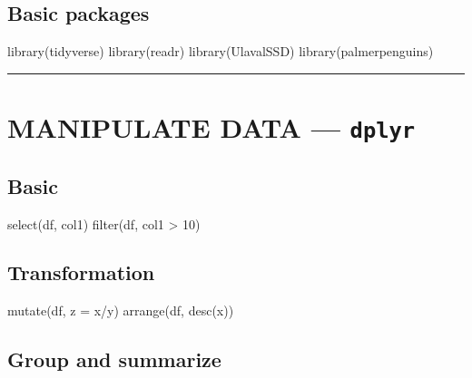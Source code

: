 \documentclass[
  8pt,
  letterpaper,
  DIV=11,
  numbers=noendperiod]{scrartcl}
\newenvironment{Shaded}{\begin{snugshade}}{\end{snugshade}}
\newcommand{\AttributeTok}[1]{\textcolor[rgb]{0.40,0.45,0.13}{#1}}
\newcommand{\DecValTok}[1]{\textcolor[rgb]{0.68,0.00,0.00}{#1}}
\newcommand{\FunctionTok}[1]{\textcolor[rgb]{0.28,0.35,0.67}{#1}}
\newcommand{\NormalTok}[1]{\textcolor[rgb]{0.00,0.23,0.31}{#1}}
\newcommand{\SpecialCharTok}[1]{\textcolor[rgb]{0.37,0.37,0.37}{#1}}
\begin{document}
\subsection{Basic packages}\label{basic-packages}

\begin{Shaded}
\begin{Highlighting}[]
\FunctionTok{library}\NormalTok{(tidyverse)}
\FunctionTok{library}\NormalTok{(readr)}
\FunctionTok{library}\NormalTok{(UlavalSSD)}
\FunctionTok{library}\NormalTok{(palmerpenguins)}
\end{Highlighting}
\end{Shaded}

\begin{center}\rule{0.5\linewidth}{0.5pt}\end{center}

\section{\texorpdfstring{MANIPULATE DATA ---
\texttt{dplyr}}{MANIPULATE DATA --- dplyr}}\label{manipulate-data-dplyr}

\subsection{Basic}\label{basic}

\begin{Shaded}
\begin{Highlighting}[]
\FunctionTok{select}\NormalTok{(df, col1)}
\FunctionTok{filter}\NormalTok{(df, col1 }\SpecialCharTok{\textgreater{}} \DecValTok{10}\NormalTok{)}
\end{Highlighting}
\end{Shaded}

\subsection{Transformation}\label{transformation}

\begin{Shaded}
\begin{Highlighting}[]
\FunctionTok{mutate}\NormalTok{(df, }\AttributeTok{z =}\NormalTok{ x}\SpecialCharTok{/}\NormalTok{y)}
\FunctionTok{arrange}\NormalTok{(df, }\FunctionTok{desc}\NormalTok{(x))}
\end{Highlighting}
\end{Shaded}

\subsection{Group and summarize}\label{group-and-summarize}
\end{document}
